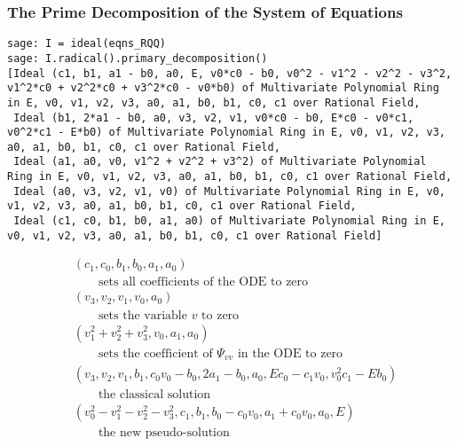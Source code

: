 \documentclass[11pt]{beamer}
\begin{document}
\begin{frame}[fragile]
\frametitle{The Prime Decomposition of the System of Equations}
{\tiny\begin{verbatim}
sage: I = ideal(eqns_RQQ)
sage: I.radical().primary_decomposition()
[Ideal (c1, b1, a1 - b0, a0, E, v0*c0 - b0, v0^2 - v1^2 - v2^2 - v3^2, v1^2*c0 + v2^2*c0 + v3^2*c0 - v0*b0) of Multivariate Polynomial Ring in E, v0, v1, v2, v3, a0, a1, b0, b1, c0, c1 over Rational Field,
 Ideal (b1, 2*a1 - b0, a0, v3, v2, v1, v0*c0 - b0, E*c0 - v0*c1, v0^2*c1 - E*b0) of Multivariate Polynomial Ring in E, v0, v1, v2, v3, a0, a1, b0, b1, c0, c1 over Rational Field,
 Ideal (a1, a0, v0, v1^2 + v2^2 + v3^2) of Multivariate Polynomial Ring in E, v0, v1, v2, v3, a0, a1, b0, b1, c0, c1 over Rational Field,
 Ideal (a0, v3, v2, v1, v0) of Multivariate Polynomial Ring in E, v0, v1, v2, v3, a0, a1, b0, b1, c0, c1 over Rational Field,
 Ideal (c1, c0, b1, b0, a1, a0) of Multivariate Polynomial Ring in E, v0, v1, v2, v3, a0, a1, b0, b1, c0, c1 over Rational Field]
\end{verbatim}}

\vskip -12pt
\begin{subequations}
\label{ideal}
\begin{align}
& \left(c_{1}, c_{0}, b_{1}, b_{0}, a_{1}, a_{0}\right)\label{ideal:5} \\
& \qquad \text{sets all coefficients of the ODE to zero} \nonumber \\
& \left(v_{3}, v_{2}, v_{1}, v_{0}, a_{0}\right)\label{ideal:4}\\
& \qquad \text{sets the variable $v$ to zero} \nonumber \\
& \left(v_{1}^{2} + v_{2}^{2} + v_{3}^{2}, v_{0}, a_{1}, a_{0}\right)\label{ideal:3}\\
& \qquad \text{sets the coefficient of $\Psi_{vv}$ in the ODE to zero} \nonumber \\
& \left(v_{3}, v_{2}, v_{1}, b_{1}, c_{0} v_{0} - b_{0}, 2 a_{1} - b_{0}, a_{0}, E c_{0} - c_{1} v_{0}, v_0^2 c_1 - E b_0\right)\label{ideal:2}\\
& \qquad \text{the classical solution} \nonumber \\
& \left(v_{0}^{2} - v_{1}^{2} - v_{2}^{2} - v_{3}^{2}, c_{1}, b_{1}, b_{0} - c_{0} v_{0}, a_{1} + c_{0} v_{0}, a_{0}, E\right)\label{ideal:1}\\
& \qquad \text{the new pseudo-solution} \nonumber
\end{align}
\end{subequations}
\end{frame}
\end{document}
